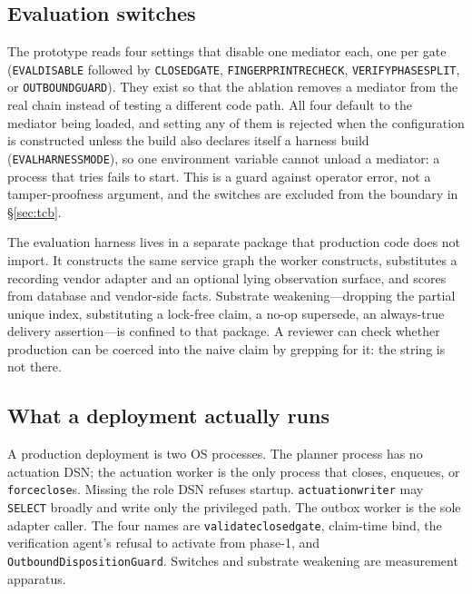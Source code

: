 \documentclass[acmsmall,manuscript,review,anonymous]{acmart}
\renewcommand{\_}{\discretionary{\textunderscore}{}{\textunderscore}}
\begin{document}
\subsection{Evaluation switches}
\label{sec:impl-switches}

\begin{sloppypar}
The prototype reads four settings that disable one mediator each, one per gate
(\texttt{EVAL\_DISABLE\_} followed by \texttt{CLOSED\_GATE},
\texttt{FINGERPRINT\_RECHECK}, \texttt{VERIFY\_PHASE\_SPLIT}, or
\texttt{OUTBOUND\_GUARD}). They exist so that the ablation removes a mediator
from the real chain instead of testing a different code path.
All four default to the mediator being loaded, and setting any of them is
rejected when the configuration is constructed unless the build also declares
itself a harness build (\texttt{EVAL\_HARNESS\_MODE}), so one environment
variable cannot unload a mediator: a process that tries fails to start. This is
a guard against operator error, not a tamper-proofness argument, and the
switches are excluded from the boundary in \S\ref{sec:tcb}.
\end{sloppypar}

The evaluation harness lives in a separate package that production code does not
import. It constructs the same service graph the worker constructs, substitutes
a recording vendor adapter and an optional lying observation surface, and scores
from database and vendor-side facts. Substrate weakening---dropping the partial
unique index, substituting a lock-free claim, a no-op supersede, an
always-true delivery assertion---is confined to that package. A reviewer can check whether production can be coerced into the naive claim
by grepping for it: the string is not there.

\subsection{What a deployment actually runs}
\label{sec:impl-deploy}

A production deployment is two {OS} processes. The planner process has
no actuation {DSN}; the actuation worker is the only process that
closes, enqueues, or \texttt{force\_close}s. Missing the role {DSN}
refuses startup. \texttt{actuation\_writer} may \texttt{SELECT} broadly
and write only the privileged path. The outbox worker is the sole
adapter caller. The four names are
\texttt{validate\_closed\_gate}, claim-time bind, the verification
agent's refusal to activate from phase-1, and
\texttt{OutboundDispositionGuard}. Switches and substrate weakening are
measurement apparatus.
\end{document}
